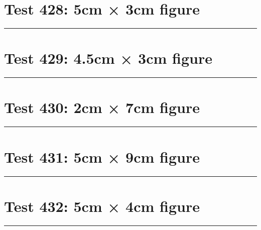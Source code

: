 \documentclass[a4paper,11pt]{article}
\begin{document}
\section*{Test 428: 5cm × 3cm figure}
\begin{swarmwrap}%
  \begin{minipage}[t]{5cm}
    \centering
    \rule{\linewidth}{3cm}
  \end{minipage}%
\end{swarmwrap}%
\swarmwrapnext
\lipsum[63]
\lipsum[64]
\lipsum[65]
\lipsum[66]
\lipsum[67]
\section*{Test 429: 4.5cm × 3cm figure}
\begin{swarmwrap}%
  \begin{minipage}[t]{4cm}
    \centering
    \rule{\linewidth}{3cm}
  \end{minipage}%
\end{swarmwrap}%
\swarmwrapnext
\lipsum[36]
\lipsum[37]
\lipsum[38]
\lipsum[39]
\lipsum[40]
\section*{Test 430: 2cm × 7cm figure}
\begin{swarmwrap}%
  \begin{minipage}[t]{2cm}
    \centering
    \rule{\linewidth}{7cm}
  \end{minipage}%
\end{swarmwrap}%
\swarmwrapnext
\lipsum[46]
\lipsum[47]
\lipsum[48]
\lipsum[49]
\lipsum[50]
\section*{Test 431: 5cm × 9cm figure}
\begin{swarmwrap}%
  \begin{minipage}[t]{5cm}
    \centering
    \rule{\linewidth}{9cm}
  \end{minipage}%
\end{swarmwrap}%
\swarmwrapnext
\lipsum[48]
\lipsum[49]
\lipsum[50]
\lipsum[51]
\lipsum[52]
\lipsum[53]
\section*{Test 432: 5cm × 4cm figure}
\begin{swarmwrap}%
  \begin{minipage}[t]{5cm}
    \centering
    \rule{\linewidth}{4cm}
  \end{minipage}%
\end{swarmwrap}%
\swarmwrapnext
\lipsum[119]
\lipsum[120]
\lipsum[121]
\end{document}
